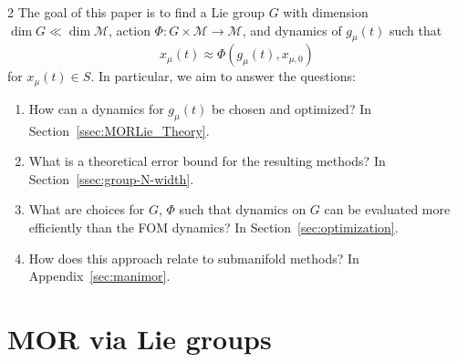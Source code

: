 \documentclass{article}
\newcommand{\M}{\mathcal{M}}                                %
\newcommand{\state}{x}
\begin{document}
\begin{multicols}{2}
The goal of this paper is to find a Lie group $G$ with dimension $\dim G \ll \dim \M$, action $\Phi:G\times\M\rightarrow\M$, and dynamics of $g_\mu(t)$ such that
\begin{equation}\label{eq:MorLie-trajectory-approximation}
    \state_\mu(t) \approx \Phi(g_\mu(t), \state_{\mu,0}) %
\end{equation}
for $\state_\mu(t) \in S$. In particular, we aim to answer the questions:
\begin{enumerate}
    \item How can a dynamics for $g_\mu(t)$ be chosen and optimized? In Section~\ref{ssec:MORLie_Theory}.
    \item What is a theoretical error bound for the resulting methods? In Section~\ref{ssec:group-N-width}.
    \item What are choices for $G$, $\Phi$ such that dynamics on $G$ can be evaluated more efficiently than the FOM dynamics? In Section~\ref{sec:optimization}.
    \item How does this approach relate to submanifold methods? In Appendix~\ref{sec:manimor}.
\end{enumerate}

\section{MOR via Lie groups}\label{sec:morlie}






\end{multicols}
\end{document}
